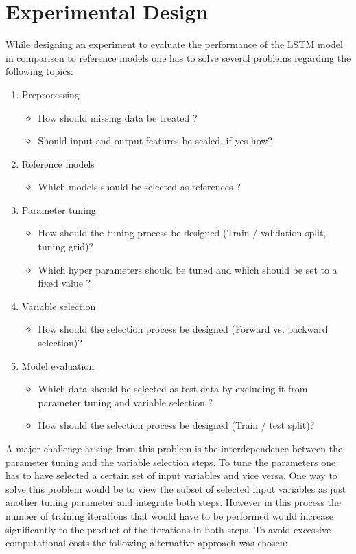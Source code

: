 \chapter{Experimental Design}
While designing an experiment to evaluate the performance of the LSTM model in comparison to reference models one has to solve several problems regarding the following topics:
\begin{enumerate}
\item Preprocessing\begin{itemize}
	\item How should missing data be treated ?
	\item Should input and output features be scaled, if yes how?
\end{itemize}
\item Reference models\begin{itemize}
	\item Which models should be selected as references ?
\end{itemize}
\item Parameter tuning \begin{itemize}
	\item How should the tuning process be designed (Train / validation split, tuning grid)? 
	\item Which hyper parameters should be tuned and which should be set to a fixed value ?
\end{itemize}
\item Variable selection \begin{itemize}
	\item How should the selection process be designed (Forward vs. backward selection)? 
\end{itemize}
\item Model evaluation \begin{itemize}
\item Which data should be selected as test data by excluding it from parameter tuning and variable selection ?
\item How should the selection process be designed (Train / test split)? 
\end{itemize}	
\end{enumerate}

A major challenge arising from this problem is the interdependence between the parameter tuning and the variable selection steps. To tune the parameters one has to have selected a certain set of input variables and vice versa. One way to solve this problem would be to view the subset of selected input variables as just another tuning parameter and integrate both steps. However in this process the number of training iterations that would have to be performed would increase significantly to the product of the iterations in both steps. To avoid excessive computational costs the following alternative approach was chosen:

